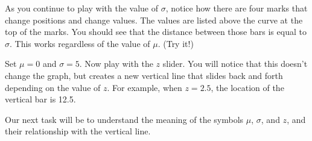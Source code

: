 \documentclass{ximera}
\begin{document}
As you continue to play with the value of $\sigma$, notice how there are four marks that change positions and change values. The values are listed above the curve at the top of the marks. You should see that the distance between those bars is equal to $\sigma$. This works regardless of the value of $\mu$. (Try it!)

Set $\mu = 0$ and $\sigma = 5$. Now play with the $z$ slider. You will notice that this doesn't change the graph, but creates a new vertical line that slides back and forth depending on the value of $z$. For example, when $z = 2.5$, the location of the vertical bar is 12.5.

Our next task will be to understand the meaning of the symbols $\mu$, $\sigma$, and $z$, and their relationship with the vertical line.
\end{document}

